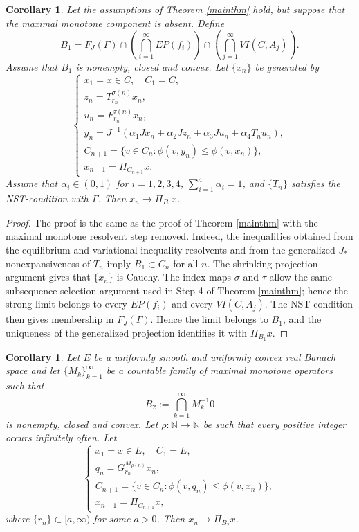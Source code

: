\documentclass[10pt,a4paper]{amsart}
\newtheorem{corollary}[theorem]{Corollary}
\numberwithin{equation}{section}
\begin{document}
\begin{corollary}\label{withoutMM}
Let the assumptions of Theorem \ref{mainthm} hold, but suppose that the maximal monotone component is absent. Define
\[
B_1=F_J(\Gamma)\cap\left(\bigcap_{i=1}^{\infty}EP(f_i)\right)
\cap\left(\bigcap_{j=1}^{\infty}VI(C,A_j)\right).
\]
Assume that $B_1$ is nonempty, closed and convex.
Let $\{x_n\}$ be generated by
\[
\left\{
\begin{array}{ll}
x_1=x\in C,\quad C_1=C,\\
z_n=T_{r_n}^{\sigma(n)}x_n,\\
u_n=F_{r_n}^{\tau(n)}x_n,\\
y_n=J^{-1}(\alpha_1Jx_n+\alpha_2Jz_n+\alpha_3Ju_n+\alpha_4T_nu_n),\\
C_{n+1}=\{v\in C_n:\phi(v,y_n)\leq\phi(v,x_n)\},\\
x_{n+1}=\Pi_{C_{n+1}}x.
\end{array}
\right.
\]
Assume that $\alpha_i\in(0,1)$ for $i=1,2,3,4$, $\sum_{i=1}^{4}\alpha_i=1$, and $\{T_n\}$ satisfies the NST-condition with $\Gamma$. Then $x_n\to \Pi_{B_1}x$.
\end{corollary}

\begin{proof}
The proof is the same as the proof of Theorem \ref{mainthm} with the maximal monotone resolvent step removed. Indeed, the inequalities obtained from the equilibrium and variational-inequality resolvents and from the generalized $J_{*}$-nonexpansiveness of $T_n$ imply $B_1\subset C_n$ for all $n$. The shrinking projection argument gives that $\{x_n\}$ is Cauchy. The index maps $\sigma$ and $\tau$ allow the same subsequence-selection argument used in Step 4 of Theorem \ref{mainthm}; hence the strong limit belongs to every $EP(f_i)$ and every $VI(C,A_j)$. The NST-condition then gives membership in $F_J(\Gamma)$. Hence the limit belongs to $B_1$, and the uniqueness of the generalized projection identifies it with $\Pi_{B_1}x$.
\end{proof}

\begin{corollary}\label{maxonly}
Let $E$ be a uniformly smooth and uniformly convex real Banach space and let $\{M_k\}_{k=1}^{\infty}$ be a countable family of maximal monotone operators such that
\[
B_2:=\bigcap_{k=1}^{\infty}M_k^{-1}0
\]
is nonempty, closed and convex. Let $\rho:\mathbb{N}\to\mathbb{N}$ be such that every positive integer occurs infinitely often. Let
\[
\left\{
\begin{array}{ll}
x_1=x\in E,\quad C_1=E,\\
q_n=G_{r_n}^{M_{\rho(n)}}x_n,\\
C_{n+1}=\{v\in C_n:\phi(v,q_n)\leq\phi(v,x_n)\},\\
x_{n+1}=\Pi_{C_{n+1}}x,
\end{array}
\right.
\]
where $\{r_n\}\subset[a,\infty)$ for some $a>0$. Then $x_n\to \Pi_{B_2}x$.
\end{corollary}
\end{document}
